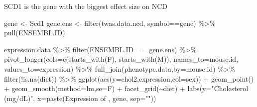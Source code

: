 \documentclass[
]{article}
\newenvironment{Shaded}{\begin{snugshade}}{\end{snugshade}}
\newcommand{\AttributeTok}[1]{\textcolor[rgb]{0.77,0.63,0.00}{#1}}
\newcommand{\FunctionTok}[1]{\textcolor[rgb]{0.00,0.00,0.00}{#1}}
\newcommand{\NormalTok}[1]{#1}
\newcommand{\OtherTok}[1]{\textcolor[rgb]{0.56,0.35,0.01}{#1}}
\newcommand{\SpecialCharTok}[1]{\textcolor[rgb]{0.00,0.00,0.00}{#1}}
\newcommand{\StringTok}[1]{\textcolor[rgb]{0.31,0.60,0.02}{#1}}
\begin{document}
SCD1 is the gene with the biggest effect size on NCD

\begin{Shaded}
\begin{Highlighting}[]
\NormalTok{gene }\OtherTok{\textless{}{-}} \StringTok{\textquotesingle{}Scd1\textquotesingle{}}
\NormalTok{gene.ens }\OtherTok{\textless{}{-}} \FunctionTok{filter}\NormalTok{(twas.data.ncd, symbol}\SpecialCharTok{==}\NormalTok{gene) }\SpecialCharTok{\%\textgreater{}\%} \FunctionTok{pull}\NormalTok{(ENSEMBL.ID)}

\NormalTok{expression.data }\SpecialCharTok{\%\textgreater{}\%}
  \FunctionTok{filter}\NormalTok{(ENSEMBL.ID }\SpecialCharTok{==}\NormalTok{ gene.ens) }\SpecialCharTok{\%\textgreater{}\%}
  \FunctionTok{pivot\_longer}\NormalTok{(}\AttributeTok{cols=}\FunctionTok{c}\NormalTok{(}\FunctionTok{starts\_with}\NormalTok{(}\StringTok{\textquotesingle{}F\textquotesingle{}}\NormalTok{),}
                      \FunctionTok{starts\_with}\NormalTok{(}\StringTok{\textquotesingle{}M\textquotesingle{}}\NormalTok{)),}
               \AttributeTok{names\_to=}\StringTok{\textquotesingle{}mouse.id\textquotesingle{}}\NormalTok{,}
               \AttributeTok{values\_to=}\StringTok{\textquotesingle{}expression\textquotesingle{}}\NormalTok{) }\SpecialCharTok{\%\textgreater{}\%}
  \FunctionTok{full\_join}\NormalTok{(phenotype.data,}\AttributeTok{by=}\StringTok{\textquotesingle{}mouse.id\textquotesingle{}}\NormalTok{) }\SpecialCharTok{\%\textgreater{}\%}
  \FunctionTok{filter}\NormalTok{(}\SpecialCharTok{!}\FunctionTok{is.na}\NormalTok{(diet)) }\SpecialCharTok{\%\textgreater{}\%}
  \FunctionTok{ggplot}\NormalTok{(}\FunctionTok{aes}\NormalTok{(}\AttributeTok{y=}\NormalTok{chol2,expression,}\AttributeTok{col=}\NormalTok{sex)) }\SpecialCharTok{+}
  \FunctionTok{geom\_point}\NormalTok{() }\SpecialCharTok{+}
  \FunctionTok{geom\_smooth}\NormalTok{(}\AttributeTok{method=}\StringTok{\textquotesingle{}lm\textquotesingle{}}\NormalTok{,}\AttributeTok{se=}\NormalTok{F) }\SpecialCharTok{+}
  \FunctionTok{facet\_grid}\NormalTok{(}\SpecialCharTok{\textasciitilde{}}\NormalTok{diet) }\SpecialCharTok{+}
  \FunctionTok{labs}\NormalTok{(}\AttributeTok{y=}\StringTok{"Cholesterol (mg/dL)"}\NormalTok{,}
       \AttributeTok{x=}\FunctionTok{paste}\NormalTok{(}\StringTok{\textquotesingle{}Expression of \textquotesingle{}}\NormalTok{, gene, }\AttributeTok{sep=}\StringTok{""}\NormalTok{))}
\end{Highlighting}
\end{Shaded}
\end{document}
